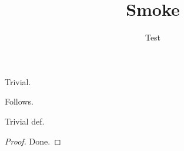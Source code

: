 \documentclass{madkour-paper}
\title{Smoke}
\author{Test}
\begin{document}
\maketitle
\begin{theorem}\label{thm-x}Trivial.\end{theorem}
\begin{lemma}Follows.\end{lemma}
\begin{definition}Trivial def.\end{definition}
\begin{proof}Done.\end{proof}
\end{document}
